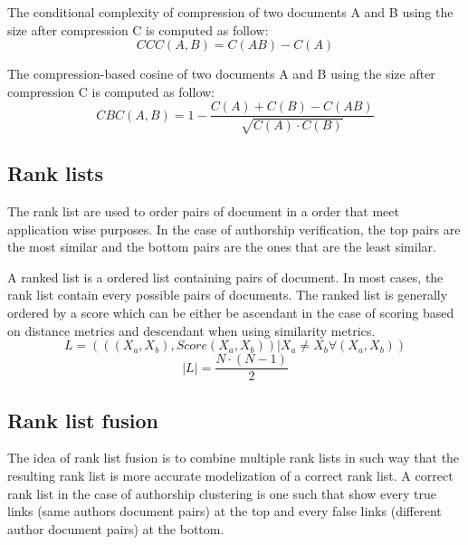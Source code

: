 \begin{definition}
  The conditional complexity of compression of two documents A and B using the size after compression C is computed as follow:
  \begin{equation}
    CCC(A, B) = C(AB) - C(A)
  \end{equation}
\end{definition}

\begin{definition}
  The compression-based cosine of two documents A and B using the size after compression C is computed as follow:
  \begin{equation}
    CBC(A, B) = 1 - \frac{C(A) + C(B) - C(AB)}{\sqrt{C(A) \cdot C(B)}}
  \end{equation}
\end{definition}

\subsection{Rank lists}

The rank list are used to order pairs of document in a order that meet application wise purposes.
In the case of authorship verification, the top pairs are the most similar and the bottom pairs are the ones that are the least similar.

\begin{definition}
  A ranked list is a ordered list containing pairs of document.
  In most cases, the rank list contain every possible pairs of documents.
  The ranked list is generally ordered by a score which can be either be ascendant in the case of scoring based on distance metrics and descendant when using similarity metrics.
  \begin{equation}
    L = (((X_a, X_b), Score(X_a, X_b)) | X_a \neq X_b \forall (X_a, X_b))
  \end{equation}
  \begin{equation}
    |L| = \frac{N \cdot (N - 1)}{2}
  \end{equation}
\end{definition}

\subsection{Rank list fusion}

The idea of rank list fusion is to combine multiple rank lists in such way that the resulting rank list is more accurate modelization of a correct rank list.
A correct rank list in the case of authorship clustering is one such that show every true links (same authors document pairs) at the top and every false links (different author document pairs) at the bottom.

